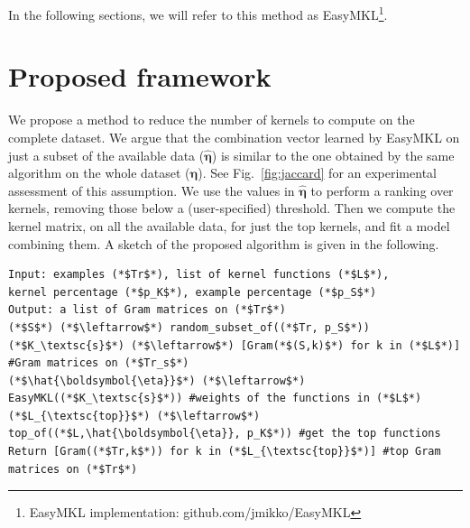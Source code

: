 \documentclass{esannV2}
\newcommand{\yy}{{\bf y}}
\newcommand{\KK}{{\bf K}}
\newcommand{\YY}{{\bf Y}}
\newcommand{\XX}{{\bf X}}
\newcommand{\1}{{\bf 1}}
\begin{document}
In the following sections, we will refer to this method as EasyMKL\footnote{EasyMKL implementation: github.com/jmikko/EasyMKL}.
%
%
\section{Proposed framework}
We propose a method to reduce the number of kernels to compute on the complete dataset.
We argue that the combination vector learned by EasyMKL on just a subset of the available data ($\hat{\boldsymbol{\eta}}$) is similar to the one obtained by the same algorithm on the whole dataset ($\boldsymbol{\eta}$). See Fig.~\ref{fig:jaccard} for an experimental assessment of this assumption.
We use the values in $\hat{\boldsymbol{\eta}}$ to perform a ranking over kernels, removing those below a (user-specified) threshold.
Then we compute the kernel matrix, on all the available data, for just the top kernels, and fit a model combining them.
%
A sketch of the proposed algorithm is given in the following.
%
\begin{lstlisting}
Input: examples (*$Tr$*), list of kernel functions (*$L$*), 
kernel percentage (*$p_K$*), example percentage (*$p_S$*) 
Output: a list of Gram matrices on (*$Tr$*)
(*$S$*) (*$\leftarrow$*) random_subset_of((*$Tr, p_S$*))
(*$K_\textsc{s}$*) (*$\leftarrow$*) [Gram(*$(S,k)$*) for k in (*$L$*)] #Gram matrices on (*$Tr_s$*)
(*$\hat{\boldsymbol{\eta}}$*) (*$\leftarrow$*) EasyMKL((*$K_\textsc{s}$*)) #weights of the functions in (*$L$*)
(*$L_{\textsc{top}}$*) (*$\leftarrow$*) top_of((*$L,\hat{\boldsymbol{\eta}}, p_K$*)) #get the top functions
Return [Gram((*$Tr,k$*)) for k in (*$L_{\textsc{top}}$*)] #top Gram matrices on (*$Tr$*)
\end{lstlisting}
\end{document}
